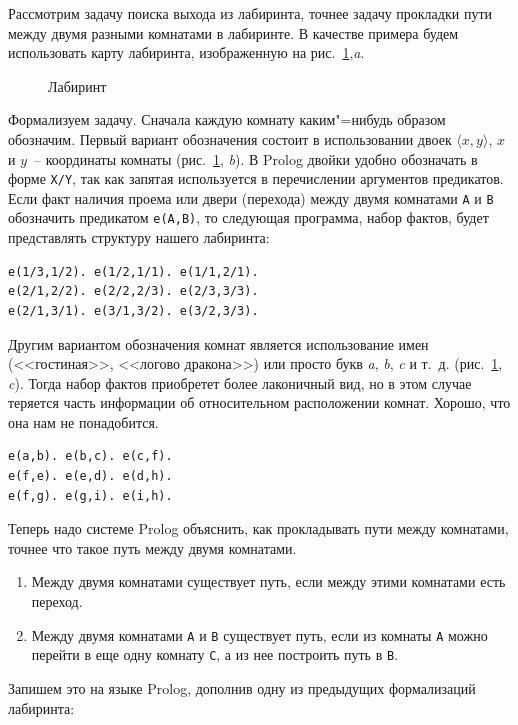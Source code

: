 \documentclass[a4paper,14pt, openany, twoside, final]{extbook} %
\begin{document}
Рассмотрим задачу поиска выхода из лабиринта, точнее задачу прокладки пути между двумя разными комнатами в лабиринте.  В качестве примера будем использовать карту лабиринта, изображенную на рис.~\ref{fig:labyrinth},\emph{a}.
\begin{figure}[hbt]
  \centering
  \def\svgwidth{\columnwidth} %
  \itshape\small
  \def\svgwidth{\columnwidth}
  
  \caption{Лабиринт}
  \label{fig:labyrinth}
\end{figure}

Формализуем задачу.  Сначала каждую комнату каким"=нибудь образом обозначим.  Первый вариант обозначения состоит в использовании двоек $\langle x,y\rangle$, $x$ и $y$~-- координаты комнаты (рис.~\ref{fig:labyrinth}, \emph{b}).  В Prolog двойки удобно обозначать в форме \texttt{X/Y}, так как запятая используется в перечислении аргументов предикатов.  Если факт наличия проема или двери (перехода) между двумя комнатами \texttt{A} и \texttt{B} обозначить предикатом \texttt{e(A,B)}, то следующая программа, набор фактов, будет представлять структуру нашего лабиринта:

\begin{verbatim}
e(1/3,1/2). e(1/2,1/1). e(1/1,2/1).
e(2/1,2/2). e(2/2,2/3). e(2/3,3/3).
e(2/1,3/1). e(3/1,3/2). e(3/2,3/3).
\end{verbatim}

Другим вариантом обозначения комнат является использование имен (<<гостиная>>, <<логово дракона>>) или просто букв \textit{a}, \textit{b}, \textit{c} и т.~д. (рис.~\ref{fig:labyrinth}, \emph{c}).  Тогда набор фактов приобретет более лаконичный вид, но в этом случае теряется часть информации об относительном расположении комнат.  Хорошо, что она нам не понадобится.

\begin{verbatim}
e(a,b). e(b,c). e(c,f).
e(f,e). e(e,d). e(d,h).
e(f,g). e(g,i). e(i,h).
\end{verbatim}

Теперь надо системе Prolog объяснить, как прокладывать пути между комнатами, точнее что такое путь между двумя комнатами.
\begin{enumerate}
\item Между двумя комнатами существует путь, если между этими комнатами есть переход.
\item Между двумя комнатами \texttt{A} и \texttt{B} существует путь, если из комнаты \texttt{A} можно перейти в еще одну комнату \texttt{C}, а из нее построить путь в \texttt{B}.
\end{enumerate}
Запишем это на языке Prolog, дополнив одну из предыдущих формализаций лабиринта:
\end{document}
